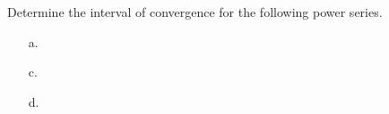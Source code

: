 Determine the interval of convergence for the following power series.

\begin{enumerate}

    \item[a.] 
    \pagebreak
    \item[c.] 
    \pagebreak
    \item[d.] 

\end{enumerate}